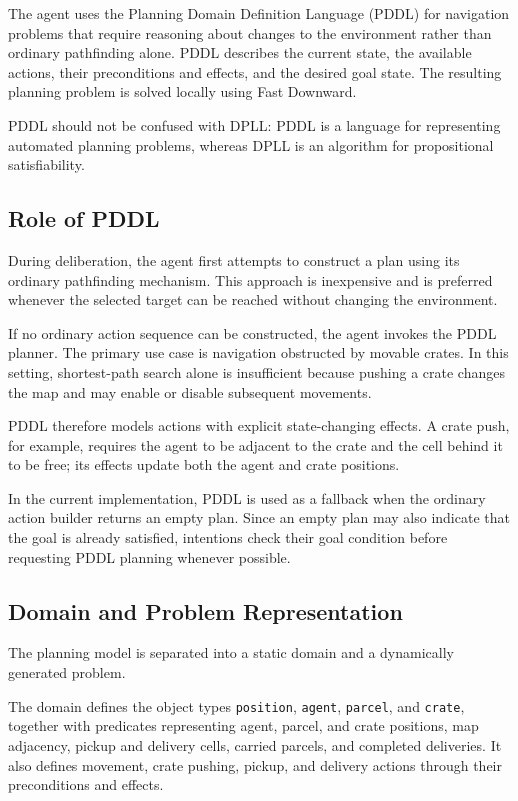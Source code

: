 \documentclass[a4paper]{article}
\begin{document}
The agent uses the Planning Domain Definition Language (PDDL) for navigation
problems that require reasoning about changes to the environment rather than
ordinary pathfinding alone. PDDL describes the current state, the available
actions, their preconditions and effects, and the desired goal state. The
resulting planning problem is solved locally using Fast Downward.

PDDL should not be confused with DPLL: PDDL is a language for representing
automated planning problems, whereas DPLL is an algorithm for propositional
satisfiability.

\subsection{Role of PDDL}

During deliberation, the agent first attempts to construct a plan using its
ordinary pathfinding mechanism. This approach is inexpensive and is preferred
whenever the selected target can be reached without changing the environment.

If no ordinary action sequence can be constructed, the agent invokes the PDDL
planner. The primary use case is navigation obstructed by movable crates. In
this setting, shortest-path search alone is insufficient because pushing a
crate changes the map and may enable or disable subsequent movements.

PDDL therefore models actions with explicit state-changing effects. A crate
push, for example, requires the agent to be adjacent to the crate and the cell
behind it to be free; its effects update both the agent and crate positions.

In the current implementation, PDDL is used as a fallback when the ordinary
action builder returns an empty plan. Since an empty plan may also indicate
that the goal is already satisfied, intentions check their goal condition
before requesting PDDL planning whenever possible.

\subsection{Domain and Problem Representation}

The planning model is separated into a static domain and a dynamically generated
problem.

The domain defines the object types \texttt{position}, \texttt{agent},
\texttt{parcel}, and \texttt{crate}, together with predicates representing
agent, parcel, and crate positions, map adjacency, pickup and delivery cells,
carried parcels, and completed deliveries. It also defines movement, crate
pushing, pickup, and delivery actions through their preconditions and effects.
\end{document}
